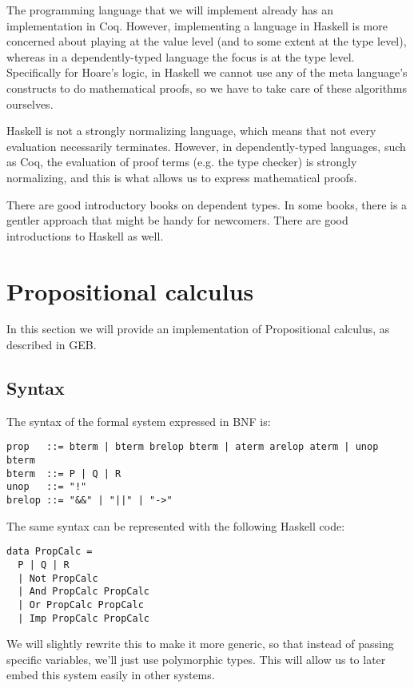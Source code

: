 \documentclass{article}
\begin{document}
The programming language that we will implement already has an implementation in Coq\cite{b3}. However, implementing a language in Haskell is more concerned about playing at the value level (and to some extent at the type level), whereas in a dependently-typed language the focus is at the type level. Specifically for Hoare's logic, in Haskell we cannot use any of the meta language's constructs to do mathematical proofs, so we have to take care of these algorithms ourselves.

Haskell is not a strongly normalizing language, which means that not every evaluation necessarily terminates. However, in dependently-typed languages, such as Coq\cite{b4}, the evaluation of proof terms (e.g. the type checker) is strongly normalizing, and this is what allows us to express mathematical proofs.

There are good introductory books on dependent types\cite{b3}. In some books, there is a gentler approach that might be handy for newcomers\cite{b5}. There are good introductions to Haskell as well\cite{b6}.

\section{Propositional calculus}

In this section we will provide an implementation of Propositional calculus, as described in GEB\cite{b7}.

\subsection{Syntax}

The syntax of the formal system expressed in BNF is:

\begin{lstlisting}
prop   ::= bterm | bterm brelop bterm | aterm arelop aterm | unop bterm
bterm  ::= P | Q | R
unop   ::= "!"
brelop ::= "&&" | "||" | "->"
\end{lstlisting}

The same syntax can be represented with the following Haskell code:

\begin{lstlisting}
data PropCalc =
  P | Q | R
  | Not PropCalc
  | And PropCalc PropCalc
  | Or PropCalc PropCalc
  | Imp PropCalc PropCalc
\end{lstlisting}

We will slightly rewrite this to make it more generic, so that instead of passing specific variables, we'll just use polymorphic types. This will allow us to later embed this system easily in other systems.
\end{document}
